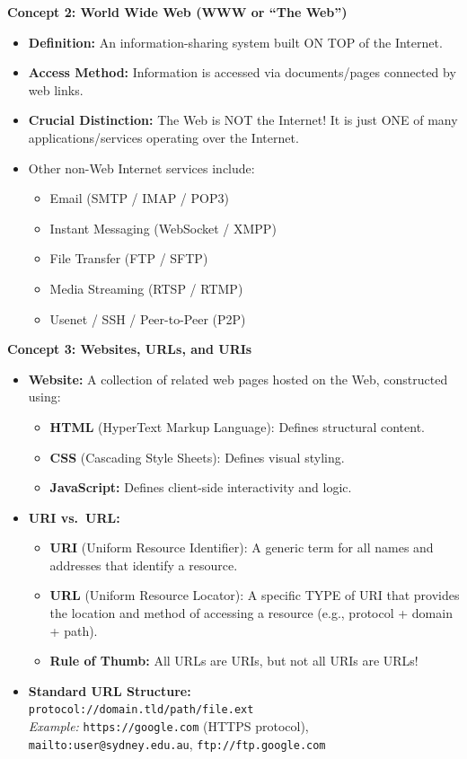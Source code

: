 \documentclass[8pt, a4paper]{article}
\begin{document}
\begin{conceptbox}
\textbf{Concept 2: World Wide Web (WWW or ``The Web'')}
\begin{itemize}
  \item \textbf{Definition:} An information-sharing system built ON TOP of the Internet.
  \item \textbf{Access Method:} Information is accessed via documents/pages connected by web links.
  \item \textbf{Crucial Distinction:} The Web is NOT the Internet! It is just ONE of many applications/services operating over the Internet.
  \item Other non-Web Internet services include:
  \begin{itemize}
    \item Email (SMTP / IMAP / POP3)
    \item Instant Messaging (WebSocket / XMPP)
    \item File Transfer (FTP / SFTP)
    \item Media Streaming (RTSP / RTMP)
    \item Usenet / SSH / Peer-to-Peer (P2P)
  \end{itemize}
\end{itemize}
\end{conceptbox}

\begin{conceptbox}
\textbf{Concept 3: Websites, URLs, and URIs}
\begin{itemize}
  \item \textbf{Website:} A collection of related web pages hosted on the Web, constructed using:
  \begin{itemize}
    \item \textbf{HTML} (HyperText Markup Language): Defines structural content.
    \item \textbf{CSS} (Cascading Style Sheets): Defines visual styling.
    \item \textbf{JavaScript:} Defines client-side interactivity and logic.
  \end{itemize}
  \item \textbf{URI vs.\ URL:}
  \begin{itemize}
    \item \textbf{URI} (Uniform Resource Identifier): A generic term for all names and addresses that identify a resource.
    \item \textbf{URL} (Uniform Resource Locator): A specific TYPE of URI that provides the location and method of accessing a resource (e.g., protocol + domain + path).
    \item \textbf{Rule of Thumb:} All URLs are URIs, but not all URIs are URLs!
  \end{itemize}
  \item \textbf{Standard URL Structure:}\\
    \texttt{protocol://domain.tld/path/file.ext}\\
    \textit{Example:} \texttt{https://google.com} (HTTPS protocol), \texttt{mailto:user@sydney.edu.au}, \texttt{ftp://ftp.google.com}
\end{itemize}
\end{conceptbox}
\end{document}
